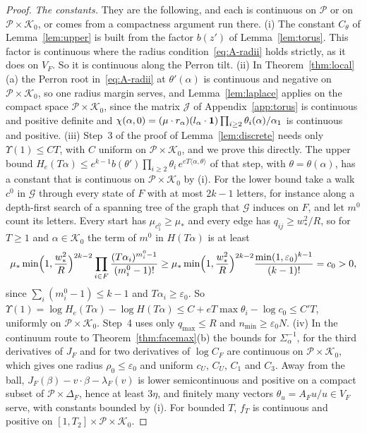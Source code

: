 \begin{proof}
\emph{The constants.} They are the following, and each is continuous on $\mathcal P$ or on
$\mathcal P\times\mathcal K_0$, or comes from a compactness argument run there.
(i) The constant $C_\theta$ of Lemma~\ref{lem:upper} is built from the factor $b(z')$ of
Lemma~\ref{lem:torus}. This factor is continuous where the
radius condition~\eqref{eq:A-radii} holds strictly, as it does on $V_F$. So it is continuous along the Perron tilt.
(ii) In Theorem~\ref{thm:local}(a) the Perron root in~\eqref{eq:A-radii} at $\theta'(\alpha)$ is
continuous and negative on $\mathcal P\times\mathcal K_0$, so one radius margin serves, and
Lemma~\ref{lem:laplace} applies on the compact space $\mathcal P\times\mathcal K_0$, since
the matrix $\mathcal J$ of Appendix~\ref{app:torus} is continuous and positive definite and
$\chi(\alpha,0)=(\mu\cdot r_\alpha)(l_\alpha\cdot\mathbf{1})\prod_{i\ge2}\theta_i(\alpha)/\alpha_1$ is
continuous and positive.
(iii) Step~3 of the proof of Lemma~\ref{lem:discrete} needs only $\Upsilon(1)\le CT$, with $C$
uniform on $\mathcal P\times\mathcal K_0$, and we prove this directly. The upper bound
$H_e(T\alpha)\le e^{k-1}b(\theta')\prod_{i\ge2}\theta_i\,e^{eT\langle\alpha,\theta\rangle}$ of that
step, with $\theta=\theta(\alpha)$, has a constant that is continuous on
$\mathcal P\times\mathcal K_0$ by (i). For the lower bound take a walk $c^0$ in $\mathcal G$ through
every state of $F$ with at most $2k-1$ letters, for instance along a depth-first search of a
spanning tree of the graph that $\mathcal G$ induces on $F$, and let $m^0$ count its letters.
Every start has $\mu_{c^0_1}\ge\mu_*$ and every edge has $q_{ij}\ge w_*^2/R$, so for $T\ge1$ and
$\alpha\in\mathcal K_0$ the term of $m^0$ in $H(T\alpha)$ is at least
\[
\mu_*\min\Bigl(1,\frac{w_*^2}R\Bigr)^{2k-2}\prod_{i\in F}\frac{(T\alpha_i)^{m^0_i-1}}{(m^0_i-1)!}
\ge\mu_*\min\Bigl(1,\frac{w_*^2}R\Bigr)^{2k-2}\frac{\min(1,\varepsilon_0)^{k-1}}{(k-1)!}=c_0>0,
\]
since $\sum_i(m^0_i-1)\le k-1$ and $T\alpha_i\ge\varepsilon_0$. So
$\Upsilon(1)=\log H_e(T\alpha)-\log H(T\alpha)\le C+eT\max\theta_i-\log c_0\le C'T$, uniformly on
$\mathcal P\times\mathcal K_0$. Step~4 uses only $q_{\max}\le R$ and
$n_{\min}\ge\varepsilon_0N$.
(iv) In the continuum route to Theorem~\ref{thm:facemax}(b) the bounds for $\Sigma_\alpha^{-1}$, for the third
derivatives of $J_F$ and for two derivatives of $\log C_F$ are continuous on
$\mathcal P\times\mathcal K_0$, which gives one radius $\rho_0\le\varepsilon_0$ and uniform
$c_U$, $C_U$, $C_1$ and $C_3$. Away from the ball, $J_F(\beta)-v\cdot\beta-\lambda_F(v)$ is
lower semicontinuous and positive on a compact subset of $\mathcal P\times\Delta_F$, hence at
least $3\eta$, and finitely many vectors $\theta_u=A_Fu/u\in V_F$ serve, with constants
bounded by (i). For bounded $T$, $f_T$ is continuous and positive on
$[1,T_2]\times\mathcal P\times\mathcal K_0$.
\end{proof}
